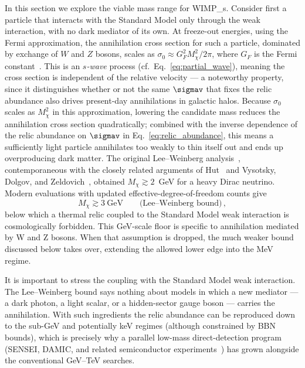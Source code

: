 %
In this section we explore the viable mass range for \glspl{WIMP_}.
Consider first a particle that interacts with the Standard Model only through the weak interaction, with no dark mediator of its own.
At freeze-out energies, using the Fermi approximation, the annihilation cross section for such a particle, dominated by exchange of $W$ and $Z$ bosons, scales as $\sigma_0 \approx G_F^2 M_\chi^2 / 2\pi$, where $G_F$ is the Fermi constant~\cite{Bertone:2004pz}.
This is an \emph{$s$-wave} process (cf.~Eq.~\eqref{eq:partial_wave}), meaning the cross section is independent of the relative velocity --- a noteworthy property, since it distinguishes whether or not the same $\sigmav$ that fixes the relic abundance also drives present-day annihilations in galactic halos.
Because $\sigma_0$ scales as $M_\chi^2$ in this approximation, lowering the candidate mass reduces the annihilation cross section quadratically; combined with the inverse dependence of the relic abundance on $\sigmav$ in Eq.~\eqref{eq:relic_abundance}, this means a sufficiently light particle annihilates too weakly to thin itself out and ends up overproducing dark matter.
The original Lee--Weinberg analysis~\cite{Lee:1977ua}, contemporaneous with the closely related arguments of Hut~\cite{Hut:1977zn} and Vysotsky, Dolgov, and Zeldovich~\cite{Vysotsky:1977pe}, obtained $M_\chi \gtrsim 2$~GeV for a heavy Dirac neutrino. Modern evaluations with updated effective-degree-of-freedom counts give~\cite{Cirelli:2024ssz,Bertone:2004pz}
\begin{equation}
	M_\chi \gtrsim 3~\mathrm{GeV} \qquad \text{(Lee--Weinberg bound)}\,,
	\label{eq:lee_weinberg}
\end{equation}
below which a thermal relic coupled to the Standard Model weak interaction is cosmologically forbidden.
This GeV-scale floor is specific to annihilation mediated by W and Z bosons. When that assumption is dropped, the much weaker \BBN bound discussed below takes over, extending the allowed lower edge into the MeV regime.

It is important to stress the coupling with the Standard Model weak interaction.
The Lee--Weinberg bound says nothing about models in which a new mediator --- a dark photon, a light scalar, or a hidden-sector gauge boson --- carries the annihilation.
With such ingredients the relic abundance can be reproduced down to the sub-GeV and potentially keV regimes (although constrained by BBN bounds), which is precisely why a parallel low-mass direct-detection program (SENSEI, DAMIC, and related semiconductor experiments~\cite{SENSEI:2020dpa,DAMIC-M:2023gxo}) has grown alongside the conventional GeV--TeV searches.

